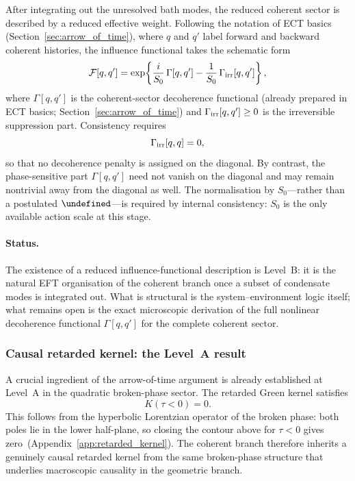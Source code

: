 \documentclass[11pt,a4paper]{article}
\let\hbar\undefined
\numberwithin{equation}{section}
\begin{document}
After integrating out the unresolved bath modes, the reduced coherent
sector is described by a reduced effective weight.
Following the notation of ECT basics (Section~\ref{sec:arrow_of_time}),
where $q$ and $q'$ label forward and backward coherent histories, the
influence functional takes the schematic form
\begin{equation}
  \label{eq:qs_influence}
  \mathcal{F}[q,q']
  =
  \exp\!\left\{
    \frac{i}{S_0}\,\Gamma[q,q']
    - \frac{1}{S_0}\,\Gamma_{\rm irr}[q,q']
  \right\},
\end{equation}
where $\Gamma[q,q']$ is the coherent-sector decoherence functional
(already prepared in ECT basics; Section~\ref{sec:arrow_of_time})
and $\Gamma_{\rm irr}[q,q']\ge 0$ is the irreversible suppression
part. Consistency requires
\[
  \Gamma_{\rm irr}[q,q] = 0,
\]
so that no decoherence penalty is assigned on the diagonal.
By contrast, the phase-sensitive part $\Gamma[q,q']$ need not
vanish on the diagonal and may remain nontrivial away from the
diagonal as well.
The normalisation by $S_0$---rather than a postulated $\hbar$---is
required by internal consistency:
$S_0$ is the only available action scale at this stage.

\paragraph{Status.}
The existence of a reduced influence-functional description is Level~B:
it is the natural EFT organisation of the coherent branch once a
subset of condensate modes is integrated out.
What is structural is the system--environment logic itself;
what remains open is the exact microscopic derivation of
the full nonlinear decoherence functional $\Gamma[q,q']$
for the complete coherent sector.

\subsubsection*{Causal retarded kernel: the Level~A result}

A crucial ingredient of the arrow-of-time argument is already
established at Level~A in the quadratic broken-phase sector.
The retarded Green kernel satisfies
\begin{equation}
  \label{eq:qs_retarded_zero}
  K(\tau<0) = 0.
\end{equation}
This follows from the hyperbolic Lorentzian operator of the broken
phase: both poles lie in the lower half-plane, so closing the contour
above for $\tau<0$ gives zero~(Appendix~\ref{app:retarded_kernel}).
The coherent branch therefore inherits a genuinely causal retarded
kernel from the same broken-phase structure that underlies macroscopic
causality in the geometric branch.
\end{document}
